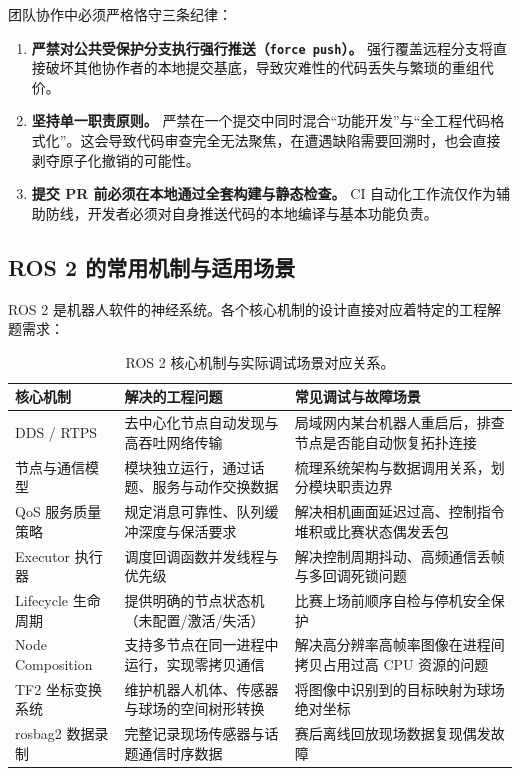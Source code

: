 团队协作中必须严格恪守三条纪律：
\begin{enumerate}[leftmargin=*]
    \item \textbf{严禁对公共受保护分支执行强行推送（\texttt{force push}）。} 强行覆盖远程分支将直接破坏其他协作者的本地提交基底，导致灾难性的代码丢失与繁琐的重组代价。
    \item \textbf{坚持单一职责原则。} 严禁在一个提交中同时混合“功能开发”与“全工程代码格式化”。这会导致代码审查完全无法聚焦，在遭遇缺陷需要回溯时，也会直接剥夺原子化撤销的可能性。
    \item \textbf{提交 PR 前必须在本地通过全套构建与静态检查。} CI 自动化工作流仅作为辅助防线，开发者必须对自身推送代码的本地编译与基本功能负责。
\end{enumerate}

\subsection{ROS 2 的常用机制与适用场景}

ROS 2 是机器人软件的神经系统。各个核心机制的设计直接对应着特定的工程解题需求：

\begin{table}[H]
\centering
\small
\begin{tabularx}{\textwidth}{p{2.6cm} p{5.0cm} X}
\toprule
\textbf{核心机制} & \textbf{解决的工程问题} & \textbf{常见调试与故障场景} \\
\midrule
DDS / RTPS & 去中心化节点自动发现与高吞吐网络传输 & 局域网内某台机器人重启后，排查节点是否能自动恢复拓扑连接 \\
\addlinespace
节点与通信模型 & 模块独立运行，通过话题、服务与动作交换数据 & 梳理系统架构与数据调用关系，划分模块职责边界 \\
\addlinespace
QoS 服务质量策略 & 规定消息可靠性、队列缓冲深度与保活要求 & 解决相机画面延迟过高、控制指令堆积或比赛状态偶发丢包 \\
\addlinespace
Executor 执行器 & 调度回调函数并发线程与优先级 & 解决控制周期抖动、高频通信丢帧与多回调死锁问题 \\
\addlinespace
Lifecycle 生命周期 & 提供明确的节点状态机（未配置/激活/失活） & 比赛上场前顺序自检与停机安全保护 \\
\addlinespace
Node Composition & 支持多节点在同一进程中运行，实现零拷贝通信 & 解决高分辨率高帧率图像在进程间拷贝占用过高 CPU 资源的问题 \\
\addlinespace
TF2 坐标变换系统 & 维护机器人机体、传感器与球场的空间树形转换 & 将图像中识别到的目标映射为球场绝对坐标 \\
\addlinespace
rosbag2 数据录制 & 完整记录现场传感器与话题通信时序数据 & 赛后离线回放现场数据复现偶发故障 \\
\bottomrule
\end{tabularx}
\caption{ROS 2 核心机制与实际调试场景对应关系。}
\end{table}

